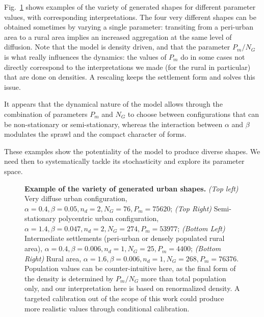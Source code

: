 \documentclass[10pt,letterpaper]{article}
\begin{document}
Fig.~\ref{fig:fig3} shows examples of the variety of generated shapes for different parameter values, with corresponding interpretations. The four very different shapes can be obtained sometimes by varying a single parameter: transiting from a peri-urban area to a rural area implies an increased aggregation at the same level of diffusion. Note that the model is density driven, and that the parameter $P_m/N_G$ is what really influences the dynamics: the values of $P_m$ do in some cases not directly correspond to the interpretations we made (for the rural in particular) that are done on densities. A rescaling keeps the settlement form and solves this issue.

It appears that the dynamical nature of the model allows through the combination of parameters $P_m$ and $N_G$ to choose between configurations that can be non-stationary or semi-stationary, whereas the interaction between $\alpha$ and $\beta$ modulates the sprawl and the compact character of forms.


These examples show the potentiality of the model to produce diverse shapes. We need then to systematically tackle its stochasticity and explore its parameter space.



\begin{figure}[!h]
\caption{\textbf{Example of the variety of generated urban shapes.} \textit{(Top left)} Very diffuse urban configuration, $\alpha = 0.4,\beta = 0.05, n_d = 2, N_G = 76, P_m = 75620$; \textit{(Top Right)} Semi-stationary polycentric urban configuration, $\alpha = 1.4,\beta = 0.047, n_d = 2, N_G = 274, P_m = 53977$; \textit{(Bottom Left)} Intermediate settlements (peri-urban or densely populated rural area), $\alpha = 0.4,\beta = 0.006, n_d = 1, N_G = 25, P_m = 4400$; \textit{(Bottom Right)} Rural area, $\alpha = 1.6,\beta = 0.006, n_d = 1, N_G = 268, P_m = 76376$. Population values can be counter-intuitive here, as the final form of the density is determined by $P_m / N_G$ more than total population only, and our interpretation here is based on renormalized density. A targeted calibration out of the scope of this work could produce more realistic values through conditional calibration.}
\label{fig:fig3}
\end{figure}
\end{document}
